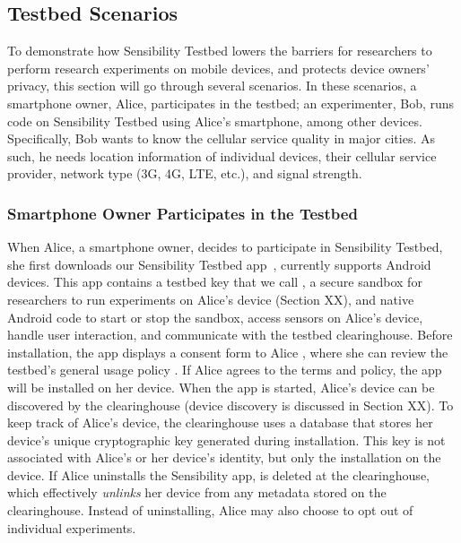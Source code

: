 \subsection{Testbed Scenarios}\label{sec-scenario}

To demonstrate how Sensibility Testbed lowers the barriers for
researchers to perform research experiments on mobile devices,
and protects device owners' privacy, this section will go
through several scenarios. In these scenarios, a smartphone owner, Alice,
participates in the testbed; an experimenter, Bob, runs code on
Sensibility Testbed using Alice's smartphone, among other
devices. Specifically, Bob wants to know the cellular service
quality in major cities. As such, he needs location information
of individual devices, their cellular service provider, network
type (3G, 4G, LTE, etc.), and signal strength.

\subsubsection{Smartphone Owner Participates in the Testbed}
\label{sec-owner-participate}

When Alice, a smartphone owner, decides to participate in
Sensibility Testbed, she first downloads our Sensibility Testbed
app~\cite{sensibility-app}, currently supports Android devices.
This app contains a testbed key that we call
, a secure sandbox for researchers to run
experiments on Alice's device (Section XX), and native Android
code to start or stop the sandbox, access sensors on Alice's
device, handle user interaction, and communicate with the
testbed clearinghouse. Before installation, the app displays a
consent form to Alice , where she can review
the testbed's general usage policy . If Alice
agrees to the terms and policy, the app will be installed on her
device. When the app is started, Alice's device can be
discovered by the clearinghouse (device discovery is discussed
in Section XX). To keep track of Alice's device, the
clearinghouse uses a database that stores her device's unique
cryptographic key  generated during
installation. This key is not associated with Alice's or her
device's identity, but only the installation on the device. If
Alice uninstalls the Sensibility app,  is
deleted at the clearinghouse, which effectively \textit{unlinks}
her device from any metadata stored on the clearinghouse.
Instead of uninstalling, Alice may also choose to opt out of
individual experiments.

